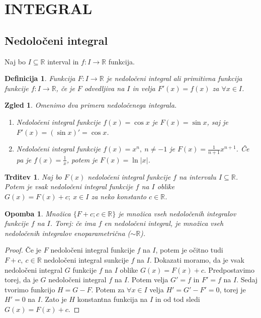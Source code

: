 \documentclass[10pt, a4paper]{article}
\newtheorem{trditev}[izr]{Trditev}
\newtheorem{defi}[izr]{Definicija}
\newenvironment{noticeB}{%
  \tcolorbox[%
  notitle,
  empty,
  enhanced,  %
  breakable,
  coltext=black,
  colback=white, 
  fontupper=\rmfamily,
  noparskip,
  sharp corners,
  boxrule=-1pt,  %
  frame hidden,
  left=7pt,  %
  right=7pt,
  top=5pt,
  bottom=5pt,
  before skip=2.5ex plus 2pt,
  after skip=2.5ex plus 2pt,
  borderline west = {1.5pt}{-0.1pt}{blue!30!black}, %
  overlay unbroken and last={%
    \draw[color=black, line width=1.25pt]
    ($(frame.south west)+(1.pt, -0.1pt)$) -- ++(2em, 0);
  }
  ]}
{\endtcolorbox}
\newenvironment{definicija}{\begin{noticeB}\begin{defi}}{%
\end{defi}\end{noticeB}}
\newtheorem*{opomba}{Opomba}
\newtheorem{zgled}[izr]{Zgled}
\newenvironment{noticeC}{%
  \tcolorbox[%
  notitle,
  empty,
  enhanced,  %
  breakable,
  coltext=black, 
  fontupper=\rmfamily,
  noparskip,
  sharp corners,
  boxrule=-1pt,  %
  frame hidden,
  left=7pt,  %
  right=7pt,
  top=5pt,
  bottom=5pt,
  before skip=2.5ex plus 2pt,
  after skip=2.5ex plus 2pt,
  overlay unbroken and last={%
  },
  ]}
{\endtcolorbox}
\newenvironment{dokaz}%
  {\begin{noticeC}\begin{proof}}%
  {\end{proof}\end{noticeC}}
\newcommand{\R}{\mathbb {R}}
\begin{document}
    \section{INTEGRAL}

\subsection{Nedoločeni integral}

Naj bo $I \subseteq \R$ interval in $f: I \rightarrow \R$ funkcija.

\begin{definicija}
    Funkcija $F: I \rightarrow \R$ je nedoločeni integral ali primitivna funkcija funkcije $f: I \rightarrow \R$, če je $F$ odvedljiva na $I$ in velja $F'(x) = f(x)$ za $\forall x \in I$.
\end{definicija}

\begin{zgled}
    Omenimo dva primera nedoločenega integrala.
    \begin{enumerate}
        \item Nedoločeni integral funkcije $f(x) = \cos x$ je $F(x) = \sin x$, saj je $F'(x) = (\sin x)' = \cos x$.
        \item Nedoločeni integral funkcije $f(x) = x^n,\ n \neq -1$ je $F(x) = \frac{1}{n+1} x^{n+1}$. 
        Če pa je $f(x) = \frac{1}{x}$, potem je $F(x) = \ln |x|$.
    \end{enumerate}
\end{zgled}

\begin{trditev}
    Naj bo $F(x)$ nedoločeni integral funkcije $f$ na intervalu $I \subseteq \R$.
    Potem je vsak nedoločeni integral funkcije $f$ na $I$ oblike $G(x) = F(x) + c;\ x \in I$ za neko konstanto $c \in \R$.
\end{trditev}

\begin{opomba}
    Množica $\{F + c; c \in \R\}$ je množica vseh nedoločenih integralov funkcije $f$ na $I$.
    Torej: če ima $f$ en nedoločeni integral, je množica vseh nedoločenih integralov enoparametrična ($\sim \R$).
\end{opomba}

\begin{dokaz}
    Če je $F$ nedoločeni integral funkcije $f$ na $I$, potem je očitno tudi $F + c,\ c \in \R$ nedoločeni integral sunkcije $f$ na $I$.
    Dokazati moramo, da je vsak nedoločeni integral $G$ funkcije $f$ na $I$ oblike $G(x) = F(x) + c$.
    Predpostavimo torej, da je $G$ nedoločeni integral $f$ na $I$. Potem velja $G' = f$ in $F' = f$ na $I$.
    Sedaj tvorimo funkcijo $H = G - F$.
    Potem za $\forall x \in I$ velja $H' = G' - F' = 0$, torej je $H' = 0$ na $I$.
    Zato je $H$ konstantna funkcija na $I$ in od tod sledi $G(x) = F(x) + c$.
\end{dokaz}
\end{document}

